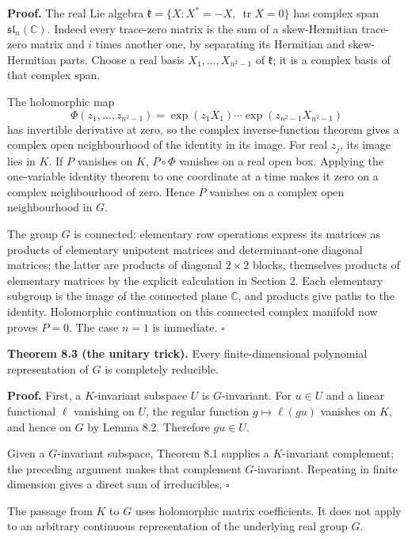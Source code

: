 \documentclass[
]{article}
\begin{document}
\textbf{Proof.} The real Lie algebra
\(\mathfrak k=\{X:X^*=-X,\ \operatorname{tr}X=0\}\) has complex span
\(\mathfrak{sl}_n(\mathbb C)\). Indeed every trace-zero matrix is the
sum of a skew-Hermitian trace-zero matrix and \(i\) times another one,
by separating its Hermitian and skew-Hermitian parts. Choose a real
basis \(X_1,\ldots,X_{n^2-1}\) of \(\mathfrak k\); it is a complex basis
of that complex span.

The holomorphic map \[
\Phi(z_1,\ldots,z_{n^2-1})
=\exp(z_1X_1)\cdots\exp(z_{n^2-1}X_{n^2-1})
\] has invertible derivative at zero, so the complex inverse-function
theorem gives a complex open neighbourhood of the identity in its image.
For real \(z_j\), its image lies in \(K\). If \(P\) vanishes on \(K\),
\(P\circ\Phi\) vanishes on a real open box. Applying the one-variable
identity theorem to one coordinate at a time makes it zero on a complex
neighbourhood of zero. Hence \(P\) vanishes on a complex open
neighbourhood in \(G\).

The group \(G\) is connected: elementary row operations express its
matrices as products of elementary unipotent matrices and
determinant-one diagonal matrices; the latter are products of diagonal
\(2\times2\) blocks, themselves products of elementary matrices by the
explicit calculation in Section 2. Each elementary subgroup is the image
of the connected plane \(\mathbb C\), and products give paths to the
identity. Holomorphic continuation on this connected complex manifold
now proves \(P=0\). The case \(n=1\) is immediate. \(\square\)

\protect{}\label{theorem-8-3}{}

\textbf{Theorem 8.3 (the unitary trick).} Every finite-dimensional
polynomial representation of \(G\) is completely reducible.

\textbf{Proof.} First, a \(K\)-invariant subspace \(U\) is
\(G\)-invariant. For \(u\in U\) and a linear functional \(\ell\)
vanishing on \(U\), the regular function \(g\mapsto\ell(gu)\) vanishes
on \(K\), and hence on \(G\) by Lemma 8.2. Therefore \(gu\in U\).

Given a \(G\)-invariant subspace, Theorem 8.1 supplies a \(K\)-invariant
complement; the preceding argument makes that complement
\(G\)-invariant. Repeating in finite dimension gives a direct sum of
irreducibles. \(\square\)

The passage from \(K\) to \(G\) uses holomorphic matrix coefficients. It
does not apply to an arbitrary continuous representation of the
underlying real group \(G\).
\end{document}
